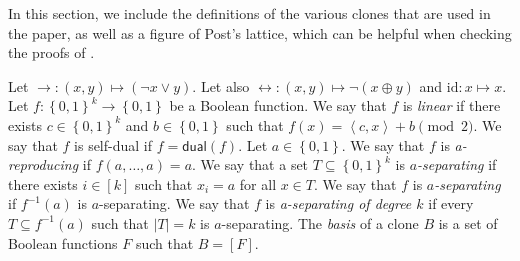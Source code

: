 \documentclass[10pt,a4paper]{article}
\newcommand\inner[2]{\left\langle #1, #2 \right\rangle}
\def\sseq{\subseteq}
\newcommand{\set}[1]{\left\{#1\right\}}
\newcommand{\card}[1]{\lvert#1\rvert}
\newcommand{\blt}{\set{0,1}}
\newcommand{\xor}{\oplus}
\newcommand{\dual}{\mathsf{dual}}
\newcommand{\clonefont}[1]{\mathrm{#1}}
\begin{document}
In this section, we include
 the definitions of the various clones that are used in the
paper,
as well as
a figure of Post's lattice, which can be helpful when checking the proofs
of
.

Let
$\rightarrow : (x,y) \mapsto (\neg x \lor y)$.
Let also
$\leftrightarrow : (x,y) \mapsto \neg (x \xor y)$
and
$\clonefont{id} : x \mapsto x$.
Let $f : \blt^k \to \blt$ be a Boolean function.
We say that 
$f$
is \emph{linear}
if there exists 
$c \in \blt^k$ and $b \in \blt$
such that
$f(x) = \inner{c}{x} + b \pmod 2$.
We say that $f$ is self-dual if $f = \dual(f)$. Let $a \in \blt$.
We say that $f$ is 
\emph{a-reproducing}
if
$f(a,\dots,a) = a$.
We say that
a set $T \sseq \blt^k$ is 
\emph{$a$-separating}
if there exists $i \in [k]$
such that
$x_i = a$ for all $x \in T$.
We say that
$f$ is 
\emph{$a$-separating}
if
$f^{-1}(a)$ is $a$-separating.
We say that $f$ is 
\emph{a-separating of degree $k$}
if every $T \sseq f^{-1}(a)$
such that $\card{T} = k$ is $a$-separating. The \emph{basis} of a clone $B$ is a set of Boolean functions $F$
such that $B = [F]$.

 
\end{document}
